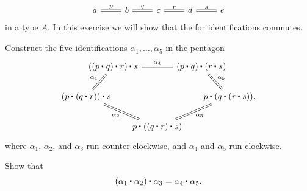 \begin{exercises}
\begin{equation*}
    \begin{tikzcd}
      a \arrow[r,equals,"p"] & b \arrow[r,equals,"q"] & c \arrow[r,equals,"r"] & d \arrow[r,equals,"s"] & e
    \end{tikzcd}
  \end{equation*}
  in a type $A$. In this exercise we will show that the  for identifications commutes.
  \begin{subexenum}
  \item Construct the five identifications $\alpha_1,\ldots,\alpha_5$ in the pentagon
    \begin{equation*}
      \begin{tikzcd}[column sep=-1.5em]
        &[-2em] \ct{(\ct{(\ct{p}{q})}{r})}{s} \arrow[rr,equals,"\alpha_4"] \arrow[dl,equals,swap,"\alpha_1"] & & \ct{(\ct{p}{q})}{(\ct{r}{s})} \arrow[dr,equals,"\alpha_5"] &[-2em] \\
        \ct{(\ct{p}{(\ct{q}{r})})}{s} \arrow[drr,equals,swap,"\alpha_2"] & & & & \ct{p}{(\ct{q}{(\ct{r}{s})})}, \\
        & & \ct{p}{(\ct{(\ct{q}{r})}{s})} \arrow[urr,equals,swap,"\alpha_3"]
      \end{tikzcd}
    \end{equation*}
    where $\alpha_1$, $\alpha_2$, and $\alpha_3$ run counter-clockwise, and $\alpha_4$ and $\alpha_5$ run clockwise.
  \item Show that
    \begin{equation*}
      \ct{(\ct{\alpha_1}{\alpha_2})}{\alpha_3} = \ct{\alpha_4}{\alpha_5}.
    \end{equation*}
  \end{subexenum}
\end{exercises}

